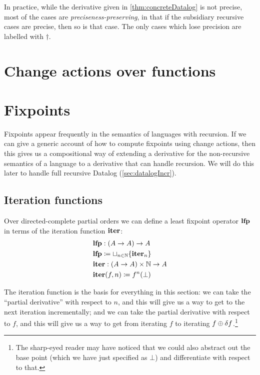 In practice, while the derivative given in \cref{thm:concreteDatalog} is not
precise, most of the cases are \emph{preciseness-preserving}, in that if the
subsidiary recursive cases are precise, then so is that case. The only cases
which lose precision are labelled with $\dagger$.

\section{Change actions over functions}


\section{Fixpoints}
\label{sec:fixpoints}

Fixpoints appear frequently in the semantics of languages with recursion. If we
can give a generic account of how to compute fixpoints using change actions,
then this gives us a compositional way of extending a derivative for the
non-recursive semantics of a language to a derivative that can handle recursion.
We will do this later to handle full recursive Datalog (\cref{sec:datalogIncr}).

\subsection{Iteration functions}

Over directed-complete partial orders we can define a least fixpoint operator $\mathbf{lfp}$ in terms of the
iteration function $\mathbf{iter}$:
\begin{align*}
  &\mathbf{lfp} : (A \rightarrow A) \rightarrow A\\
  &\mathbf{lfp} \coloneqq \sqcup_{n \in \mathbb{N}} \{ \mathbf{iter}_n \}\\
  &\mathbf{iter} : (A \rightarrow A) \times \mathbb{N} \rightarrow A\\
  &\mathbf{iter}(f, n) \coloneqq f^n(\bot)
\end{align*}

The iteration function is the basis for everything in this section:
we can take the ``partial derivative'' with respect to $n$, and this will give us a way to get
to the next iteration incrementally; and we can take the partial derivative
with respect to $f$, and this will give us a way to get from iterating $f$ to iterating $f
\oplus \delta f$.\footnote{The sharp-eyed reader may have noticed that we
  could also abstract out the base point (which we have just specified as
  $\bot$) and differentiate with respect to that.}

